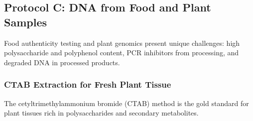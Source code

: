 \subsection{Protocol C: DNA from Food and Plant Samples}
\label{subsec:protocols:food}

Food authenticity testing and plant genomics present unique challenges: high polysaccharide and polyphenol content, \acrshort{PCR} inhibitors from processing, and degraded DNA in processed products.

\subsubsection{CTAB Extraction for Fresh Plant Tissue}

The cetyltrimethylammonium bromide (CTAB) method is the gold standard for plant tissues rich in polysaccharides and secondary metabolites.

